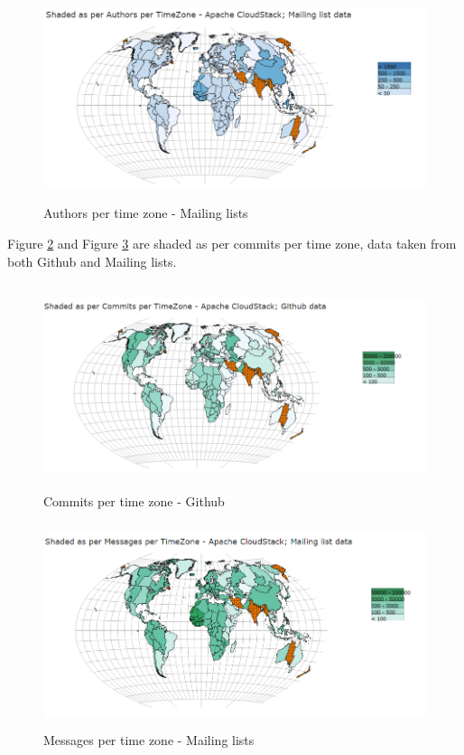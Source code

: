 \documentclass[seploa]{beavtex}
\begin{document}
\begin{figure}[H]
\centering
\includegraphics[width=130mm,height=60mm]{image5.PNG}
\caption{Authors per time zone - Mailing lists}
\label{fig:auML}
\end{figure}

Figure \ref{fig:coHub} and Figure \ref{fig:mgML} are shaded as per commits per time zone, data taken from both Github and Mailing lists.

\begin{figure}[H]
\centering
\includegraphics[width=130mm,height=60mm]{image6.PNG}
\caption{Commits per time zone - Github}
\label{fig:coHub}
\end{figure}

\begin{figure}[H]
\centering
\includegraphics[width=130mm,height=60mm]{image7.PNG}
\caption{Messages per time zone - Mailing lists}
\label{fig:mgML}
\end{figure}
\end{document}

